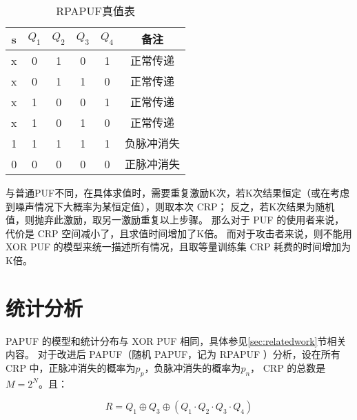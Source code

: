 \begin{table}[h!]
\centering
\caption{RPAPUF真值表}
\label{tab:true-table-rpa}
\begin{tabular}{c|cccc|c}
\hline
s & $ Q_1 $ & $ Q_2 $ & $ Q_3 $ & $ Q_4 $ & 备注 \\
\hline
x & 0 & 1 & 0 & 1 & 正常传递\\
x & 0 & 1 & 1 & 0 & 正常传递\\
x & 1 & 0 & 0 & 1 & 正常传递\\
x & 1 & 0 & 1 & 0 & 正常传递\\
1 & 1 & 1 & 1 & 1 & 负脉冲消失\\
0 & 0 & 0 & 0 & 0 & 正脉冲消失\\
\hline
\end{tabular}
\end{table}

与普通PUF不同，在具体求值时，需要重复激励K次，若K次结果恒定（或在考虑到噪声情况下大概率为某恒定值），则取本次 CRP；
反之，若K次结果为随机值，则抛弃此激励，取另一激励重复以上步骤。
那么对于 PUF 的使用者来说，代价是 CRP 空间减小了，且求值时间增加了K倍。
而对于攻击者来说，则不能用 XOR PUF 的模型来统一描述所有情况，且取等量训练集 CRP 耗费的时间增加为K倍。

\section{统计分析}\label{sec:rpa_stat}
PAPUF 的模型和统计分布与 XOR PUF 相同，具体参见\ref{sec:relatedwork}节相关内容。
对于改进后 PAPUF（随机 PAPUF，记为 RPAPUF ）分析，设在所有 CRP 中，正脉冲消失的概率为$ p_p $，负脉冲消失的概率为$ p_n $， CRP 的总数是 $ M=2^N $。且：

\begin{equation}
R=Q_1\oplus Q_3\oplus (Q_1\cdot Q_2\cdot Q_3\cdot Q_4)
\end{equation}

